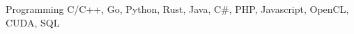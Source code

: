 
\begin{cvskills}

  \cvskill
    {Programming} %
    {C/C++, Go, Python, Rust, Java, C\#, PHP, Javascript, OpenCL, CUDA, SQL} %


\end{cvskills}